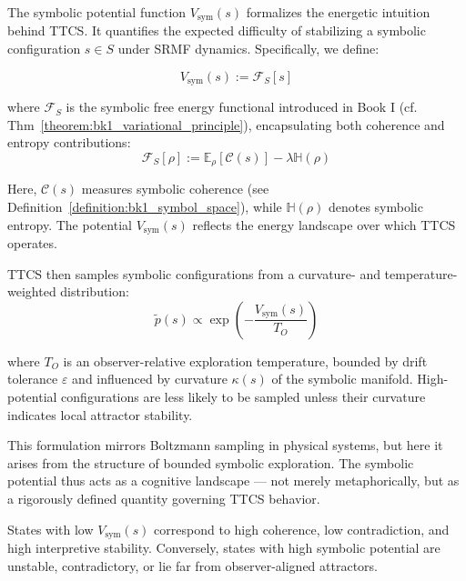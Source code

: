 \begin{scholium}
\label{scholium:bk4_symbolic_potential_energy}

The symbolic potential function \( V_{\text{sym}}(s) \) formalizes the energetic intuition behind TTCS. It quantifies the expected difficulty of stabilizing a symbolic configuration \( s \in S \) under SRMF dynamics. Specifically, we define:

\[
V_{\text{sym}}(s) := \mathcal{F}_S[s]
\]

where \( \mathcal{F}_S \) is the symbolic free energy functional introduced in Book I (cf. Thm~\ref{theorem:bk1_variational_principle}), encapsulating both coherence and entropy contributions:
\[
\mathcal{F}_S[\rho] := \mathbb{E}_\rho[\mathcal{C}(s)] - \lambda \mathbb{H}(\rho)
\]

Here, \( \mathcal{C}(s) \) measures symbolic coherence (see Definition~\ref{definition:bk1_symbol_space}), while \( \mathbb{H}(\rho) \) denotes symbolic entropy. The potential \( V_{\text{sym}}(s) \) reflects the energy landscape over which TTCS operates.

TTCS then samples symbolic configurations from a curvature- and temperature-weighted distribution:
\[
\tilde{p}(s) \propto \exp\left(-\frac{V_{\text{sym}}(s)}{T_O}\right)
\]

where \( T_O \) is an observer-relative exploration temperature, bounded by drift tolerance \( \varepsilon \) and influenced by curvature \( \kappa(s) \) of the symbolic manifold. High-potential configurations are less likely to be sampled unless their curvature indicates local attractor stability.

This formulation mirrors Boltzmann sampling in physical systems, but here it arises from the structure of bounded symbolic exploration. The symbolic potential thus acts as a cognitive landscape — not merely metaphorically, but as a rigorously defined quantity governing TTCS behavior.

States with low \( V_{\text{sym}}(s) \) correspond to high coherence, low contradiction, and high interpretive stability. Conversely, states with high symbolic potential are unstable, contradictory, or lie far from observer-aligned attractors.

\end{scholium}

